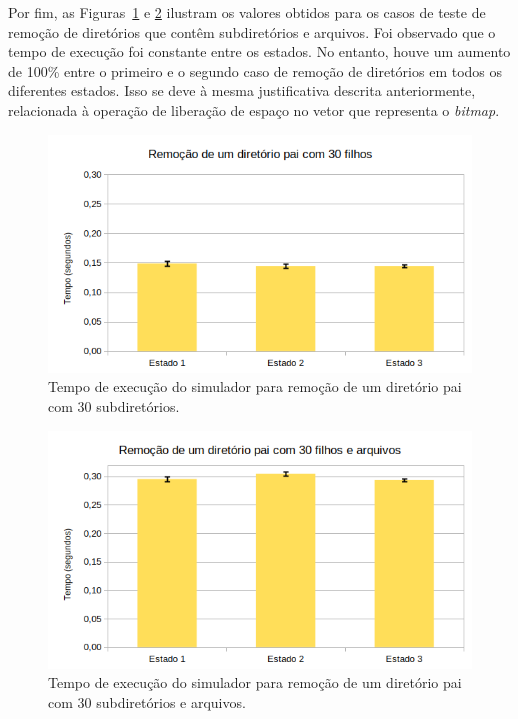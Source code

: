 \documentclass[12pt]{article}
\begin{document}
Por fim, as Figuras~\ref{fig:case7} e \ref{fig:case8} ilustram os valores obtidos para os casos de teste de remoção de diretórios que contêm subdiretórios e arquivos. Foi observado que o tempo de execução foi constante entre os estados. No entanto, houve um aumento de 100\% entre o primeiro e o segundo caso de remoção de diretórios em todos os diferentes estados. Isso se deve à mesma justificativa descrita anteriormente, relacionada à operação de liberação de espaço no vetor que representa o \textit{bitmap}.

\begin{figure}[H]
	\centering
	\includegraphics[width=1\textwidth]{case7.png}
	\caption{Tempo de execução do simulador para remoção de um diretório pai com 30 subdiretórios.}
	\label{fig:case7}
\end{figure}

\begin{figure}[H]
	\centering
	\includegraphics[width=1\textwidth]{case8.png}
	\caption{Tempo de execução do simulador para remoção de um diretório pai com 30 subdiretórios e arquivos.}
	\label{fig:case8}
\end{figure}




\end{document}
